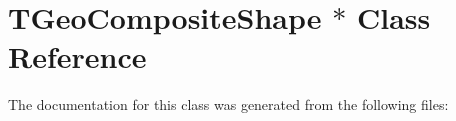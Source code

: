 \hypertarget{class_t_geo_composite_shape_01_5}{}\section{T\+Geo\+Composite\+Shape $\ast$ Class Reference}
\label{class_t_geo_composite_shape_01_5}


The documentation for this class was generated from the following files\+: